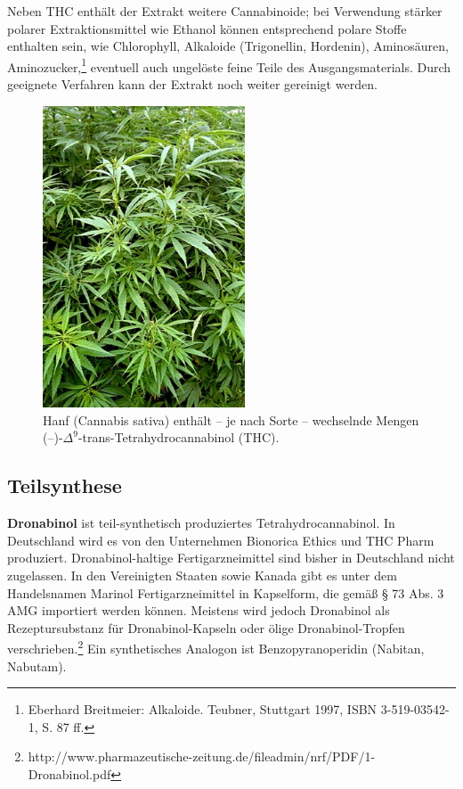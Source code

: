 \documentclass[openany]{scrbook}
\begin{document}
	Neben THC enthält der Extrakt weitere Cannabinoide; bei Verwendung stärker polarer Extraktionsmittel wie Ethanol können entsprechend polare Stoffe enthalten sein, wie Chlorophyll, Alkaloide (Trigonellin, Hordenin), Aminosäuren, Aminozucker,\footnote[3]{ Eberhard Breitmeier: Alkaloide. Teubner, Stuttgart 1997, ISBN 3-519-03542-1, S. 87 ff.} eventuell auch ungelöste feine Teile des Ausgangsmaterials. Durch geeignete Verfahren kann der Extrakt noch weiter gereinigt werden.
	
\begin{figure}[h]
	\centering
	\includegraphics[width=6cm]{abb4}
	\caption{Hanf (Cannabis sativa) enthält – je nach Sorte – wechselnde Mengen (–)-$\Delta^9$-trans-Tetrahydrocannabinol (THC).}
	\label{fig:Cannabis_sativa}
	\end{figure}
	
\subsection{Teilsynthese}
		\textbf{Dronabinol} ist teil-synthetisch produziertes Tetrahydrocannabinol. In Deutschland wird es von den Unternehmen Bionorica Ethics und THC Pharm produziert. Dronabinol-haltige Fertigarzneimittel sind bisher in Deutschland nicht zugelassen. In den Vereinigten Staaten sowie Kanada gibt es unter dem Handelsnamen Marinol Fertigarzneimittel in Kapselform, die gemäß § 73 Abs. 3 AMG importiert werden können. Meistens wird jedoch Dronabinol als Rezeptursubstanz für Dronabinol-Kapseln oder ölige Dronabinol-Tropfen verschrieben.\footnote[4]{http://www.pharmazeutische-zeitung.de/fileadmin/nrf/PDF/1-Dronabinol.pdf} Ein synthetisches Analogon ist Benzopyranoperidin (Nabitan, Nabutam).
		
\end{document}
